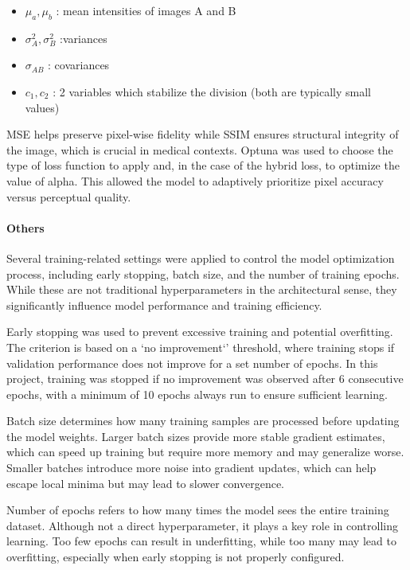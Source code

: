 \documentclass[twocolumn]{article}
\begin{document}
\begin{itemize}
    \item $\mu_a,\mu_b$ : mean intensities of images A and B
    \item $\sigma_A^2, \sigma_B^2$ :variances
    \item $\sigma_{AB}$ : covariances
    \item $c_1,c_2$ : 2 variables which stabilize the division (both are typically small values)
\end{itemize}

MSE helps preserve pixel-wise fidelity while SSIM ensures structural integrity of the image, which is crucial in medical contexts. 
Optuna was used to choose the type of loss function to apply and, in the case of the hybrid loss, to optimize the value of alpha. 
This allowed the model to adaptively prioritize pixel accuracy versus perceptual quality. 

\paragraph{Others}
Several training-related settings were applied to control the model optimization process, including early stopping, batch size, and the number of training epochs.
While these are not traditional hyperparameters in the architectural sense, they significantly influence model performance and training efficiency.

Early stopping was used to prevent excessive training and potential overfitting. The criterion is based on a `no improvement`' threshold, where training stops if validation performance does not improve for a set number of epochs. 
In this project, training was stopped if no improvement was observed after 6 consecutive epochs, with a minimum of 10 epochs always run to ensure sufficient learning.

Batch size determines how many training samples are processed before updating the model weights. Larger batch sizes provide more stable gradient estimates, which can speed up training but require more memory and may generalize worse. 
Smaller batches introduce more noise into gradient updates, which can help escape local minima but may lead to slower convergence.

Number of epochs refers to how many times the model sees the entire training dataset. Although not a direct hyperparameter, it plays a key role in controlling learning. 
Too few epochs can result in underfitting, while too many may lead to overfitting, especially when early stopping is not properly configured.
\end{document}

